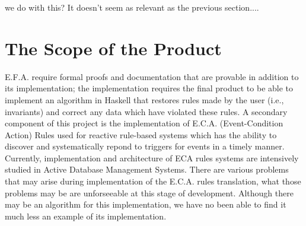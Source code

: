 \documentclass[12pt]{report}
\begin{document}
we do with this? It doesn't seem as relevant as the previous section.... 
\section{The Scope of the Product}\label{sec:ScopeOfProduct}
E.F.A. require formal proofs and documentation that are provable in addition to its implementation; 
the implementation requires the final product to be able to implement an algorithm in Haskell that 
restores rules made by the user (i.e., invariants) and correct any data which have violated these 
rules. A secondary component of this project is the implementation of E.C.A. (Event-Condition 
Action) Rules used for reactive rule-based systems which has the ability to discover and 
systematically repond to triggers for events in a timely manner. 
Currently, implementation and architecture of ECA rules systems are intensively studied in Active 
Database Management Systems. %
There are various problems that may arise during implementation of the E.C.A. rules translation, 
what those problems may be are unforseeable at this stage of development. Although there may be an 
algorithm for this implementation, we have no been able to find it much less an example of its 
implementation.
\end{document}
